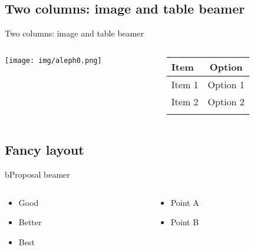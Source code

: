 \documentclass[
  11pt,
  aspectratio=169]{beamer}
\providecommand{\tightlist}{%
  \setlength{\itemsep}{0pt}\setlength{\parskip}{0pt}}
\begin{document}
\subsection{Two columns: image and table
beamer}\label{two-columns-image-and-table-beamer}

\begin{frame}{Two columns: image and table beamer}
\begin{columns}[T]
\begin{column}{0.48\linewidth}
\texttt{[image: img/aleph0.png]}
\end{column}

\begin{column}{0.48\linewidth}
\begin{longtable}[]{@{}lc@{}}
\toprule\noalign{}
\textbf{Item} & \textbf{Option} \\
\midrule\noalign{}
\endhead
Item 1 & Option 1 \\
Item 2 & Option 2 \\
\bottomrule\noalign{}
\end{longtable}
\end{column}
\end{columns}
\end{frame}

\subsection{Fancy layout}\label{fancy-layout}

\begin{frame}{bProposal beamer}
\label{bproposal-beamer}
\begin{columns}[T]
\begin{column}{0.48\linewidth}
\begin{itemize}
\tightlist
\item
  Good
\item
  Better
\item
  Best
\end{itemize}
\end{column}

\begin{column}{0.48\linewidth}
\begin{itemize}
\tightlist
\item
  Point A
\item
  Point B
\end{itemize}
\end{column}
\end{columns}
\end{frame}
\end{document}
